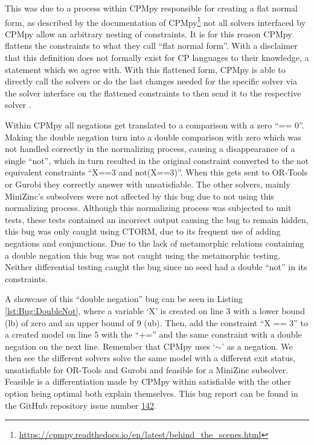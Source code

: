 This was due to a process within CPMpy responsible for creating a flat normal form, as described by the documentation of CPMpy\footnote{\url{https://cpmpy.readthedocs.io/en/latest/behind_the_scenes.html}} not all solvers interfaced by CPMpy allow an arbitrary nesting of constraints. It is for this reason CPMpy flattens the constraints to what they call “flat normal form”. With a disclaimer that this definition does not formally exist for CP languages to their knowledge, a statement which we agree with. With this flattened form, CPMpy is able to directly call the solvers or do the last changes needed for the specific solver via the solver interface on the flattened constraints to then send it to the respective solver \cite{CPMpyGithub}. 

Within CPMpy all negations get translated to a comparison with a zero “== 0”. Making the double negation turn into a double comparison with zero which was not handled correctly in the normalizing process, causing a disappearance of a single “not”, which in turn resulted in the original constraint converted to the not equivalent constraints “X==3 and not(X==3)”. When this gets sent to OR-Tools or Gurobi they correctly answer with unsatisfiable. The other solvers, mainly MiniZinc’s subsolvers were not affected by this bug due to not using this normalizing process. Although this normalizing process was subjected to unit tests, these tests contained an incorrect output causing the bug to remain hidden, this bug was only caught using CTORM, due to its frequent use of adding negations and conjunctions. Due to the lack of metamorphic relations containing a double negation this bug was not caught using the metamorphic testing. Neither differential testing caught the bug since no seed had a double “not” in its constraints. 

A showcase of this “double negation” bug can be seen in Listing \ref{lst:Bug:DoubleNot}, where a variable ‘X’ is created on line 3 with a lower bound (lb) of zero and an upper bound of 9 (ub). Then, add the constraint “X == 3” to a created model on line 5 with the “+=” and the same constraint with a double negation on the next line. Remember that CPMpy uses ‘$\sim$’ as a negation. We then see the different solvers solve the same model with a different exit status, unsatisfiable for OR-Tools and Gurobi and feasible for a MiniZinc subsolver. Feasible is a differentiation made by CPMpy within satisfiable with the other option being optimal both explain themselves. This bug report can be found in the GitHub repository issue number \href{https://github.com/CPMpy/cpmpy/issues/142}{142}.


